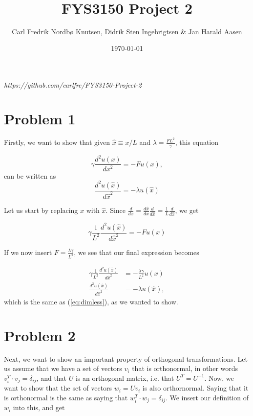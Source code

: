 \documentclass[english,notitlepage]{revtex4-1}  %
\begin{document}
\title{FYS3150 Project 2}      %
\author{Carl Fredrik Nordbø Knutsen, Didrik Sten Ingebrigtsen \& Jan Harald Aasen}          %
\date{\today}                             %
\noaffiliation                            %


\maketitle 
    
\textit{https://github.com/carlfre/FYS3150-Project-2}
    
\section*{Problem 1}

Firstly, we want to show that given $\hat{x} \equiv x/L$ and $\lambda = \frac{FL^2}{\gamma}$, this equation

\[ \gamma \frac{d^2 u(x)}{dx^2} = -F u(x), \]
can be written as
\begin{equation}
\frac{d^2 u(\hat{x})}{d \hat{x}^2} = - \lambda u(\hat{x})
\label{eq:dimless}
\end{equation}

Let us start by replacing $x$ with $\hat{x}$. Since $\frac{d}{dx} = \frac{d \hat{x}}{dx} \frac{d}{d \hat{x}} = \frac{1}{L} \frac{d}{d \hat{x}}$, we get

\[ \gamma \frac{1}{L^2} \frac{d^2 u(\hat{x})}{d \hat{x}^2} = -F u(x) \]

If we now insert $F = \frac{\lambda \gamma}{L^2}$, we see that our final expression becomes

\begin{align*}
\gamma \frac{1}{L^2} \frac{d^2 u(\hat{x})}{d \hat{x}^2} &= -\frac{\lambda \gamma}{L^2} u(x) \\
\frac{d^2 u(\hat{x})}{d \hat{x}^2} &= - \lambda u(\hat{x}),
\end{align*}
which is the same as (\ref{eq:dimless}), as we wanted to show.

\section*{Problem 2}
Next, we want to show an important property of orthogonal transformations. Let us assume that we have a set of vectors $v_i$ that is orthonormal, in other words $v_i^T \cdot v_j = \delta_{ij}$, and that $U$ is an orthogonal matrix, i.e. that $U^T = U^{-1}$. Now, we want to show that the set of vectors $w_i = U v_i$ is also orthornormal. Saying that it is orthonormal is the same as saying that $w_i^T \cdot w_j = \delta_{ij}$. We insert our definition of $w_i$ into this, and get
\end{document}
